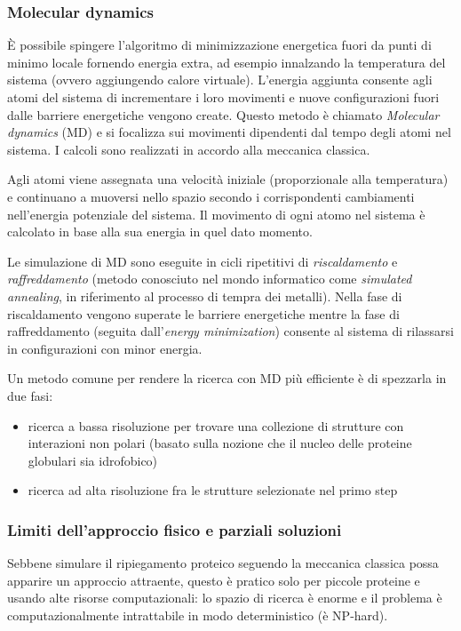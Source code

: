 {{\subsubsection{Molecular dynamics}

È possibile spingere l'algoritmo di minimizzazione energetica fuori da punti di minimo locale fornendo energia extra, ad esempio innalzando la temperatura del sistema (ovvero aggiungendo calore virtuale). L'energia aggiunta consente agli atomi del sistema di incrementare i loro movimenti e nuove configurazioni fuori dalle barriere energetiche vengono create. Questo metodo è chiamato \textit{Molecular dynamics} (MD) e si focalizza sui movimenti dipendenti dal tempo degli atomi nel sistema. I calcoli sono realizzati in accordo alla meccanica classica. 

\par Agli atomi viene assegnata una velocità iniziale (proporzionale alla temperatura) e continuano a muoversi nello spazio secondo i corrispondenti cambiamenti nell'energia potenziale del sistema. Il movimento di ogni atomo nel sistema è calcolato in base alla sua energia in quel dato momento.

\par Le simulazione di MD sono eseguite in cicli ripetitivi di \textit{riscaldamento} e \textit{raffreddamento} (metodo conosciuto nel mondo informatico come \textit{simulated annealing}, in riferimento al processo di tempra dei metalli). Nella fase di riscaldamento vengono superate le barriere energetiche mentre la fase di raffreddamento (seguita dall'\textit{energy minimization}) consente al sistema di rilassarsi in configurazioni con minor energia.

\par Un metodo comune per rendere la ricerca con MD più efficiente è di spezzarla in due fasi:
\begin{itemize}
	\item ricerca a bassa risoluzione per trovare una collezione di strutture con interazioni non polari (basato sulla nozione che il nucleo delle proteine globulari sia idrofobico)
	\item ricerca ad alta risoluzione fra le strutture selezionate nel primo step
\end{itemize}

\subsubsection{Limiti dell'approccio fisico e parziali soluzioni}
Sebbene simulare il ripiegamento proteico seguendo la meccanica classica possa apparire un approccio attraente, questo è pratico solo per piccole proteine e usando alte risorse computazionali: lo spazio di ricerca è enorme e il problema è computazionalmente intrattabile in modo deterministico (è NP-hard)\supercite{abbass2020enhancing}.

}}
